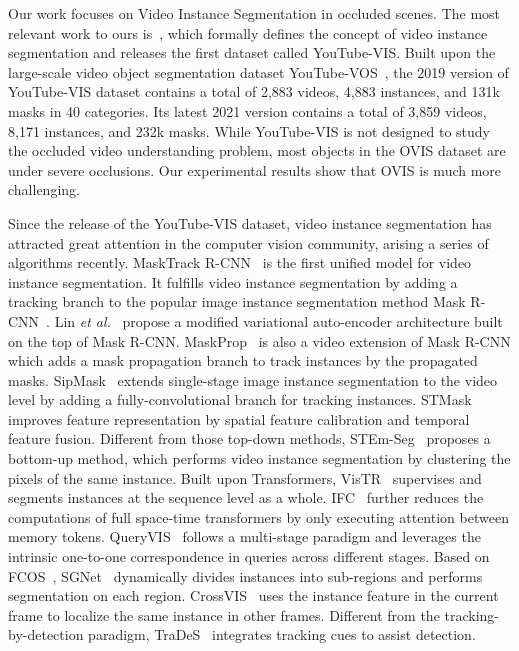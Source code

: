 \documentclass[twocolumn]{svjour3}          \smartqed  \usepackage{graphicx}
\begin{document}
\begin{sloppypar}
Our work focuses on Video Instance Segmentation in occluded scenes. The most relevant work to ours is~\cite{youtube_vis}, which formally defines the concept of video instance segmentation and releases the first dataset called YouTube-VIS. Built upon the large-scale video object segmentation dataset YouTube-VOS~\cite{youtube_vos}, the 2019 version of YouTube-VIS dataset contains a total of 2,883 videos, 4,883 instances, and 131k masks in 40 categories. Its latest 2021 version contains a total of 3,859 videos, 8,171 instances, and 232k masks. While YouTube-VIS is not designed to study the occluded video understanding problem, most objects in the OVIS dataset are under severe occlusions. Our experimental results show that OVIS is much more challenging.

Since the release of the YouTube-VIS dataset, video instance segmentation has attracted great attention in the computer vision community, arising a series of algorithms recently. MaskTrack R-CNN~\cite{youtube_vis} is the first unified model for video instance segmentation. It fulfills video instance segmentation by adding a tracking branch to the popular image instance segmentation method Mask R-CNN~\cite{maskrcnn}. Lin \textit{et al.}~\cite{vist_vae} propose a modified variational auto-encoder architecture built on the top of Mask R-CNN. 
MaskProp~\cite{maskprop} is also a video extension of Mask R-CNN which adds a mask propagation branch to track instances by the propagated masks. SipMask~\cite{sipmask} extends single-stage image instance segmentation to the video level by adding a fully-convolutional branch for tracking instances. STMask~\cite{stmask} improves feature representation by spatial feature calibration and temporal feature fusion. Different from those top-down methods, STEm-Seg~\cite{stem_seg} proposes a bottom-up method, which performs video instance segmentation by clustering the pixels of the same instance. Built upon Transformers, VisTR~\cite{vistr} supervises and segments instances at the sequence level as a whole. IFC~\cite{ifc} further reduces the computations of full space-time transformers by only executing attention between memory tokens. QueryVIS~\cite{queryinst} follows a multi-stage paradigm and leverages the intrinsic one-to-one correspondence in queries across different stages. Based on FCOS~\cite{fcos}, SGNet~\cite{sgnet} dynamically divides instances into sub-regions and performs segmentation on each region. CrossVIS~\cite{crossvis} uses the instance feature in the current frame to localize the same instance in other frames. Different from the tracking-by-detection paradigm, TraDeS~\cite{trades} integrates tracking cues to assist detection.



\end{sloppypar}
\end{document}
